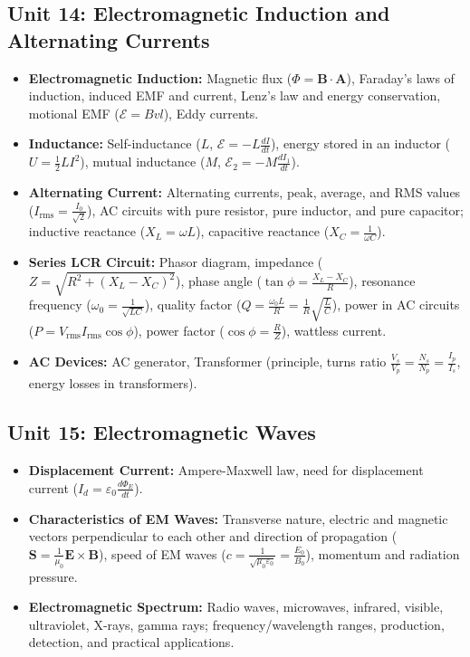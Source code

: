 \documentclass[11pt,a4paper]{article}
\begin{document}
\subsection{Unit 14: Electromagnetic Induction and Alternating Currents}
\begin{itemize}
  \item \textbf{Electromagnetic Induction:} Magnetic flux ($\Phi = \mathbf{B}\cdot\mathbf{A}$), Faraday's laws of induction, induced EMF and current, Lenz's law and energy conservation, motional EMF ($\mathcal{E} = Bvl$), Eddy currents.
  \item \textbf{Inductance:} Self-inductance ($L$, $\mathcal{E} = -L\frac{dI}{dt}$), energy stored in an inductor ($U = \frac{1}{2}LI^2$), mutual inductance ($M$, $\mathcal{E}_2 = -M\frac{dI_1}{dt}$).
  \item \textbf{Alternating Current:} Alternating currents, peak, average, and RMS values ($I_{\text{rms}} = \frac{I_0}{\sqrt{2}}$), AC circuits with pure resistor, pure inductor, and pure capacitor; inductive reactance ($X_L = \omega L$), capacitive reactance ($X_C = \frac{1}{\omega C}$).
  \item \textbf{Series LCR Circuit:} Phasor diagram, impedance ($Z = \sqrt{R^2 + (X_L - X_C)^2}$), phase angle ($\tan\phi = \frac{X_L - X_C}{R}$), resonance frequency ($\omega_0 = \frac{1}{\sqrt{LC}}$), quality factor ($Q = \frac{\omega_0 L}{R} = \frac{1}{R}\sqrt{\frac{L}{C}}$), power in AC circuits ($P = V_{\text{rms}}I_{\text{rms}}\cos\phi$), power factor ($\cos\phi = \frac{R}{Z}$), wattless current.
  \item \textbf{AC Devices:} AC generator, Transformer (principle, turns ratio $\frac{V_s}{V_p} = \frac{N_s}{N_p} = \frac{I_p}{I_s}$, energy losses in transformers).
\end{itemize}

\subsection{Unit 15: Electromagnetic Waves}
\begin{itemize}
  \item \textbf{Displacement Current:} Ampere-Maxwell law, need for displacement current ($I_d = \varepsilon_0 \frac{d\Phi_E}{dt}$).
  \item \textbf{Characteristics of EM Waves:} Transverse nature, electric and magnetic vectors perpendicular to each other and direction of propagation ($\mathbf{S} = \frac{1}{\mu_0}\mathbf{E}\times\mathbf{B}$), speed of EM waves ($c = \frac{1}{\sqrt{\mu_0\varepsilon_0}} = \frac{E_0}{B_0}$), momentum and radiation pressure.
  \item \textbf{Electromagnetic Spectrum:} Radio waves, microwaves, infrared, visible, ultraviolet, X-rays, gamma rays; frequency/wavelength ranges, production, detection, and practical applications.
\end{itemize}
\end{document}
